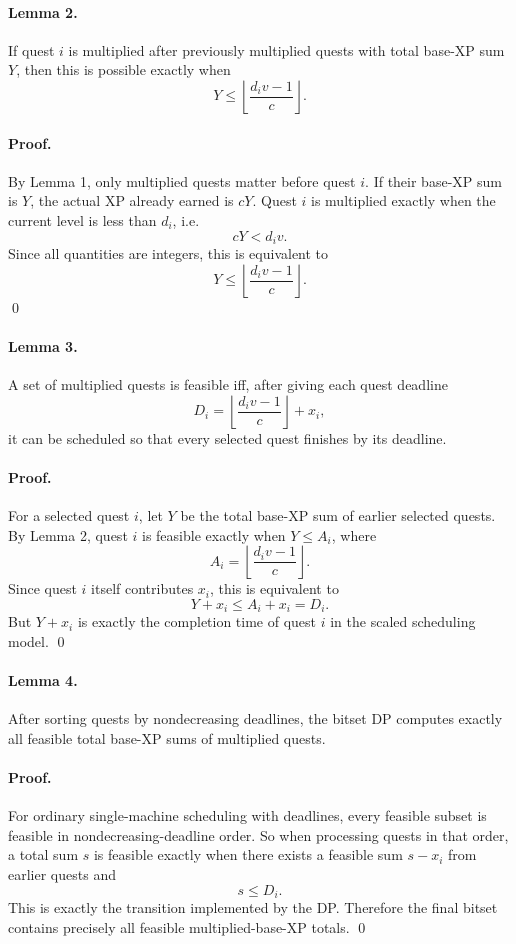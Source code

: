 \documentclass[11pt]{article}
\begin{document}
\paragraph{Lemma 2.}
If quest $i$ is multiplied after previously multiplied quests with total base-XP sum $Y$, then this is
possible exactly when
\[
    Y \le \left\lfloor \frac{d_i v - 1}{c} \right\rfloor.
\]

\paragraph{Proof.}
By Lemma 1, only multiplied quests matter before quest $i$.
If their base-XP sum is $Y$, the actual XP already earned is $cY$.
Quest $i$ is multiplied exactly when the current level is less than $d_i$, i.e.
\[
    cY < d_i v.
\]
Since all quantities are integers, this is equivalent to
\[
    Y \le \left\lfloor \frac{d_i v - 1}{c} \right\rfloor.
\]
\qed

\paragraph{Lemma 3.}
A set of multiplied quests is feasible iff, after giving each quest deadline
\[
    D_i = \left\lfloor \frac{d_i v - 1}{c} \right\rfloor + x_i,
\]
it can be scheduled so that every selected quest finishes by its deadline.

\paragraph{Proof.}
For a selected quest $i$, let $Y$ be the total base-XP sum of earlier selected quests.
By Lemma 2, quest $i$ is feasible exactly when $Y \le A_i$, where
\[
    A_i = \left\lfloor \frac{d_i v - 1}{c} \right\rfloor.
\]
Since quest $i$ itself contributes $x_i$, this is equivalent to
\[
    Y + x_i \le A_i + x_i = D_i.
\]
But $Y+x_i$ is exactly the completion time of quest $i$ in the scaled scheduling model. \qed

\paragraph{Lemma 4.}
After sorting quests by nondecreasing deadlines, the bitset DP computes exactly all feasible total
base-XP sums of multiplied quests.

\paragraph{Proof.}
For ordinary single-machine scheduling with deadlines, every feasible subset is feasible in
nondecreasing-deadline order.
So when processing quests in that order, a total sum $s$ is feasible exactly when there exists a feasible
sum $s-x_i$ from earlier quests and
\[
    s \le D_i.
\]
This is exactly the transition implemented by the DP.
Therefore the final bitset contains precisely all feasible multiplied-base-XP totals. \qed
\end{document}
